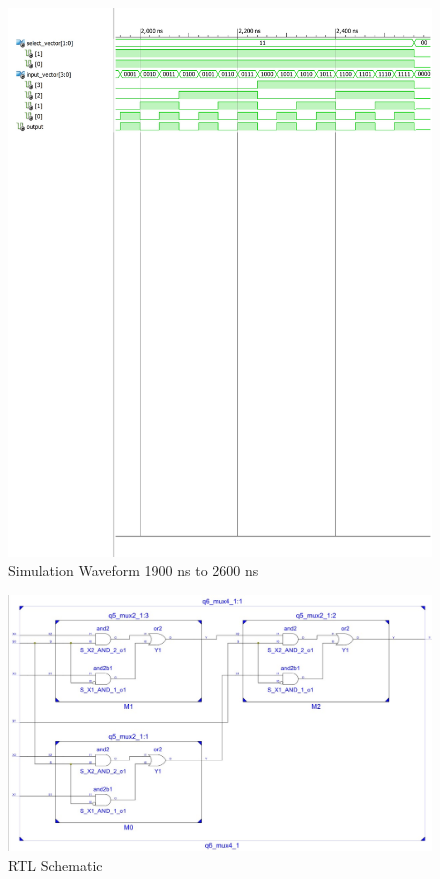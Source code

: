 \documentclass{article}
\begin{document}
\begin{figure}[H]
    \centering
    \includegraphics[scale=0.75,cframe=blue 0.5pt 3pt]{6aw-4.pdf}
    \caption{Simulation Waveform 1900 ns to 2600 ns }
\end{figure}


\begin{figure}[H]
    \centering
    \includegraphics[scale=0.65,cframe=blue 0.5pt 3pt]{6s.jpg}
    \caption{RTL Schematic  }
\end{figure}
\end{document}
